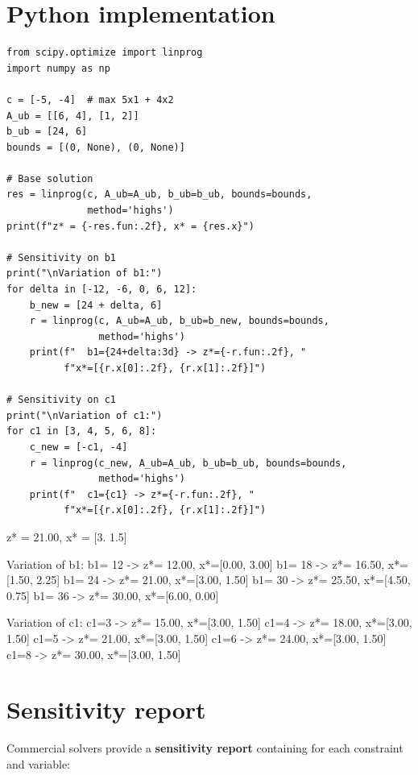 \section{Python implementation}

\begin{codeblock}[title=\textbf{Sensitivity analysis with SciPy}]
\begin{verbatim}
from scipy.optimize import linprog
import numpy as np

c = [-5, -4]  # max 5x1 + 4x2
A_ub = [[6, 4], [1, 2]]
b_ub = [24, 6]
bounds = [(0, None), (0, None)]

# Base solution
res = linprog(c, A_ub=A_ub, b_ub=b_ub, bounds=bounds,
              method='highs')
print(f"z* = {-res.fun:.2f}, x* = {res.x}")

# Sensitivity on b1
print("\nVariation of b1:")
for delta in [-12, -6, 0, 6, 12]:
    b_new = [24 + delta, 6]
    r = linprog(c, A_ub=A_ub, b_ub=b_new, bounds=bounds,
                method='highs')
    print(f"  b1={24+delta:3d} -> z*={-r.fun:.2f}, "
          f"x*=[{r.x[0]:.2f}, {r.x[1]:.2f}]")

# Sensitivity on c1
print("\nVariation of c1:")
for c1 in [3, 4, 5, 6, 8]:
    c_new = [-c1, -4]
    r = linprog(c_new, A_ub=A_ub, b_ub=b_ub, bounds=bounds,
                method='highs')
    print(f"  c1={c1} -> z*={-r.fun:.2f}, "
          f"x*=[{r.x[0]:.2f}, {r.x[1]:.2f}]")
\end{verbatim}
\end{codeblock}

\begin{codeoutput}
z* = 21.00, x* = [3.  1.5]

Variation of b1:
  b1= 12 -> z*= 12.00, x*=[0.00, 3.00]
  b1= 18 -> z*= 16.50, x*=[1.50, 2.25]
  b1= 24 -> z*= 21.00, x*=[3.00, 1.50]
  b1= 30 -> z*= 25.50, x*=[4.50, 0.75]
  b1= 36 -> z*= 30.00, x*=[6.00, 0.00]

Variation of c1:
  c1=3 -> z*= 15.00, x*=[3.00, 1.50]
  c1=4 -> z*= 18.00, x*=[3.00, 1.50]
  c1=5 -> z*= 21.00, x*=[3.00, 1.50]
  c1=6 -> z*= 24.00, x*=[3.00, 1.50]
  c1=8 -> z*= 30.00, x*=[3.00, 1.50]
\end{codeoutput}

\section{Sensitivity report}

Commercial solvers provide a \textbf{sensitivity report} containing for each
constraint and variable:

